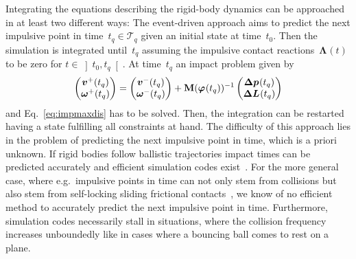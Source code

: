 \documentclass[global,twocolumn]{svjour}
\let\vec\bm
\newcommand{\intervalOO}[2]{\ensuremath{\left] #1, #2 \right[}}
\newcommand{\mat}[1]{{\bf #1}}
\newcommand{\dvect}[2]{\ensuremath{\begin{pmatrix}#1\\#2\end{pmatrix}}}
\newcommand{\orient} [1]{\ensuremath{\vec{\varphi}_{#1}}}
\newcommand{\linvel} [1]{\ensuremath{\vec{v}_{#1}}}
\newcommand{\angvel} [1]{\ensuremath{\vec{\omega}_{#1}}}
\newcommand{\linimp}   [1]{\ensuremath{\vec{\Delta p}_{#1}}}
\newcommand{\angimp}   [1]{\ensuremath{\vec{\Delta L}_{#1}}}
\newcommand{\tImp}{\ensuremath{t_q}}
\newcommand{\contactimpulse}[1]{\ensuremath{\vec{\Lambda}_{#1}}}
\begin{document}
			Integrating the equations describing the rigid-body dynamics can be
			approached in at least two different ways: The event-driven approach aims to
			predict the next impulsive point in time~$\tImp \in \mathcal{T}_q$
			given an initial state at time~$t_0$. Then the simulation is integrated
			until~$\tImp$ assuming the impulsive
			contact reactions~$\contactimpulse{}(t)$ to be zero for
			$t \in \intervalOO{t_0}{\tImp}$. At time~$\tImp$ an impact
			problem given by
			\begin{equation*}
				\dvect{\linvel{}^{+}(\tImp)}{\angvel{}^{+}(\tImp)} = \dvect{\linvel{}^-(\tImp)}{\angvel{}^-(\tImp)} + \mat{M}(\orient{}(\tImp))^{-1} \dvect{ \linimp{}(\tImp)}{\angimp{}(\tImp)}
			\end{equation*}
			and Eq.~\eqref{eq:impmaxdis} has to be solved. Then, the integration can
			be restarted having a state fulfilling all constraints at hand.
			The difficulty of this
			approach lies in the problem of predicting the next impulsive point
			in time, which is a priori unknown. If rigid bodies follow ballistic
			trajectories impact times can be predicted accurately and efficient
			simulation codes exist~\cite{mirtich96, bannerman11}. For the more
			general case, where e.g.~impulsive points in time can not only stem
			from collisions but also stem from self-locking sliding frictional
			contacts~\cite{shen11}, we know of no efficient method to
			accurately predict the next impulsive point in time. Furthermore,
			simulation codes necessarily stall in situations, where the collision
			frequency increases unboundedly like in cases where a bouncing ball
			comes to rest on a plane.
\end{document}
